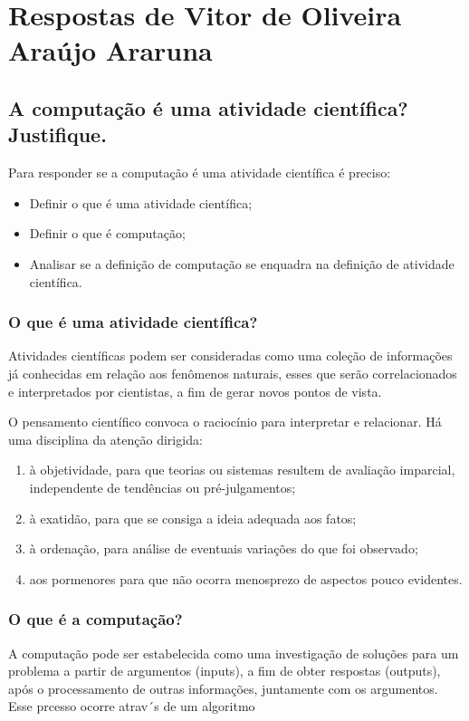 \section{Respostas de Vitor de Oliveira Araújo Araruna \label{tarefa-vitorararuna-componentes-eperimento}}

\subsection{A computação é uma atividade científica? Justifique. }

Para responder se a computação é uma atividade científica é preciso:
\begin{itemize}
    \item Definir o que é uma atividade científica;
    \item Definir o que é computação;
    \item Analisar se a definição de computação se enquadra na definição de atividade científica. 
\end{itemize}

\subsubsection{O que é uma atividade científica?} Atividades científicas podem ser consideradas como uma coleção de informações já conhecidas em relação aos fenômenos naturais, esses que serão correlacionados e interpretados por cientistas, a fim de gerar novos pontos de vista.

O pensamento científico convoca o raciocínio para interpretar e relacionar. Há uma disciplina da atenção dirigida:

\begin{enumerate}
    \item à objetividade, para que teorias ou sistemas resultem de avaliação imparcial, independente de tendências ou pré-julgamentos;
    \item  à exatidão, para que se consiga a ideia adequada aos fatos;
    \item  à ordenação, para análise de eventuais variações do que foi observado;
    \item aos pormenores para que não ocorra menosprezo de aspectos pouco evidentes.
\end{enumerate}

\subsubsection{O que é a computação?}
A computação pode ser estabelecida como uma investigação de soluções para um problema a partir de argumentos (inputs), a fim de obter respostas (outputs), após o processamento de outras informações, juntamente com os argumentos. Esse prcesso ocorre atrav´s de um algoritmo 

